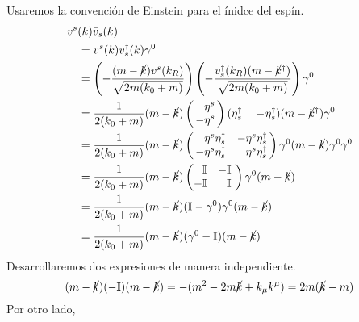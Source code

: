 \subsection{}
Usaremos la convención de Einstein para el ínidce del espín.
\begin{equation}
\begin{split}
&v^s(k)\bar v_s(k)\\
&\quad=v^s(k)v_s^\dagger(k)\gamma^0\\
&\quad=
\left(
-\frac{(m-\ck)v^s(k_R)}{\sqrt{2m(k_0+m)}}
\right)
\left(
-\frac{v_s^\dagger(k_R)(m-\ck^\dagger)}{\sqrt{2m(k_0+m)}}
\right)\gamma^0\\
&\quad=
\frac1{2(k_0+m)}
(m-\ck)
\left(
\begin{array}r
\eta^s\!\!\\
\!\!-\eta^s\!\!
\end{array}
\right)
(\eta_s^\dagger\quad-\!\eta_s^\dagger)
(m-\ck^\dagger)\gamma^0\\
&\quad=
\frac1{2(k_0+m)}
(m-\ck)
\left(\begin{array}{rr}
\eta^s\eta_s^\dagger&-\eta^s\eta_s^\dagger\!\!\\
\!\!-\eta^s\eta_s^\dagger&\eta^s\eta_s^\dagger\!\!
\end{array}\right)\gamma^0
(m-\ck)\gamma^0\gamma^0\\
&\quad=
\frac1{2(k_0+m)}
(m-\ck)
\left(\begin{array}{rr}
\id&-\id\!\\
\!\!\!-\id&\id\!
\end{array}\right)
\gamma^0
(m-\ck)\\
&\quad=
\frac1{2(k_0+m)}
(m-\ck)
(\id-\gamma^0)
\gamma^0(m-\ck)\\
&\quad=
\frac1{2(k_0+m)}
(m-\ck)
(\gamma^0-\id)
(m-\ck)
\end{split}
\label{ragatoba}
\end{equation}
Desarrollaremos dos expresiones de manera independiente.
\begin{equation}
(m-\cancel k)(-\mathbb I)(m-\cancel k)
=-(m^2-2m\cancel k+k_\mu k^\mu)
=2m(\cancel k-m)
\label{garabato}
\end{equation}
Por otro lado,
